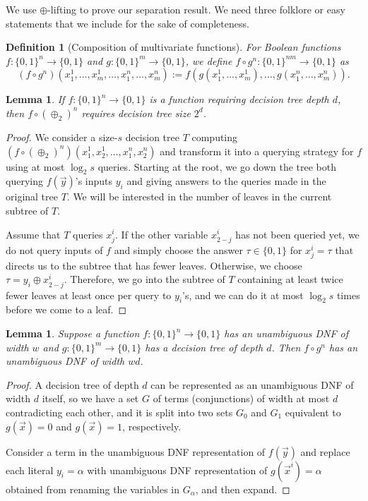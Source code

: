 \documentclass[11pt]{article}
\newcommand{\TODOJ}[1]{}%
\numberwithin{equation}{section}
\newtheorem{lemma}[theorem]{Lemma}
\newtheorem{definition}[theorem]{Definition}
\begin{document}
We use $\oplus$-lifting to prove our separation result.
We need three folklore or easy statements that we include for the sake of completeness.

\begin{definition}[Composition of multivariate functions] For Boolean functions $f\colon \{0,1\}^n \to \{0,1\}$ and $g\colon\{0,1\}^m \to \{0,1\}$, we define $f \circ g^n\colon\{0,1\}^{nm} \to \{0,1\}$ as \[(f \circ g^n)(x^1_1, \dots, x^1_m, \dots, x^n_1, \dots, x^n_m) := f(g(x^1_1, \dots, x^1_m), \dots, g(x^n_1, \dots, x^n_m)).\]
\end{definition}

\begin{lemma}\label{lem:xor_dt}
If $f\colon \{0,1\}^n \to \{0,1\}$ is a function requiring decision tree depth $d$, then $f \circ (\oplus_2)^n$ requires decision tree size $2^{d}$.  
\end{lemma}
\begin{proof}
We consider a size-$s$ decision tree $T$ computing $(f \circ (\oplus_2)^n)(x^1_1, x^1_2, \dots, x^n_1, x^n_2)$
and transform it into a querying strategy for $f$ using at most $\log_2 s$ queries.
Starting at the root, we go down the tree
both querying $f(\vec y)$'s inputs $y_i$ and giving answers
to the queries made in the original tree $T$.
We will be interested in the number of leaves in the current subtree of $T$.

Assume that $T$ queries $x^i_j$. If the other variable $x^i_{2-j}$ has not been queried yet,
we do not query inputs of $f$ and simply choose the answer $\tau\in\{0,1\}$ for $x^i_j = \tau$
that directs us to the subtree that has fewer leaves.
Otherwise, we choose $\tau = y_i\oplus x^i_{2-j}$.
Therefore, we go into the subtree of $T$ containing at least twice fewer leaves
at least once per query to $y_i$'s, and we can do it at most $\log_2 s$ times
before we come to a leaf.
\end{proof}

\begin{lemma}\label{lem:unambiguous-certificate-composition}
  Suppose a function $f\colon\{0,1\}^n \to \{0,1\}$ has an unambiguous DNF of width $w$ and $g\colon\{0,1\}^m \to \{0,1\}$ has a decision tree of depth $d$. Then $f \circ g^n$ has an unambiguous DNF of width $w d$.
\end{lemma}
\begin{proof}
A decision tree of depth $d$ can be represented as an unambiguous DNF of width $d$ itself,
so we have a set $G$ of terms (conjunctions) of width at most $d$ contradicting each other,
and it is split into two sets $G_0$ and $G_1$ equivalent to $g(\vec{x})=0$ and $g(\vec{x})=1$, respectively.

Consider a term in the unambiguous DNF representation of $f(\vec y)$ and replace each literal $y_i = \alpha$ with unambiguous DNF representation of $g(\vec{x}^i) = \alpha$ obtained from renaming the variables in $G_\alpha$, and then expand.  
\end{proof}
\end{document}
